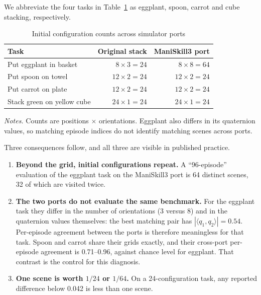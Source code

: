\documentclass[pdflatex,iicol,sn-apa]{sn-jnl}
\theoremstyle{remark}
\newcommand{\tablenote}[1]{\par\vspace{4pt}\noindent
\begin{minipage}{\linewidth}\tablefootnotefont\raggedright #1\par\end{minipage}}
\begin{document}
We abbreviate the four tasks in Table~\ref{tab2} as eggplant, spoon, carrot and cube stacking, respectively.

\begin{table}[t]
\centering
\begin{lrbox}{\tablecontentbox}
\begin{tabular}{@{}lrr@{}}
\toprule
Task & Original stack & ManiSkill3 port \\
\midrule
Put eggplant in basket & $8 \times 3 = 24$ & $8 \times 8 = 64$ \\
Put spoon on towel & $12 \times 2 = 24$ & $12 \times 2 = 24$ \\
Put carrot on plate & $12 \times 2 = 24$ & $12 \times 2 = 24$ \\
Stack green on yellow cube & $24 \times 1 = 24$ & $24 \times 1 = 24$ \\
\bottomrule
\end{tabular}
\end{lrbox}
\begin{minipage}{\wd\tablecontentbox}
\caption{Initial configuration counts across simulator ports}\label{tab2}
\usebox{\tablecontentbox}
\tablenote{\textit{Notes.} Counts are positions $\times$ orientations. Eggplant also differs in its quaternion values, so matching episode indices do not identify matching scenes across ports.}
\end{minipage}
\end{table}

Three consequences follow, and all three are visible in published practice.

\begin{enumerate}
\item \textbf{Beyond the grid, initial configurations repeat.} A ``96-episode'' evaluation of the
eggplant task on the ManiSkill3 port is 64 distinct scenes, 32 of which are visited twice.
\item \textbf{The two ports do not evaluate the same benchmark.} For the eggplant task they differ
in the number of orientations (3 versus 8) and in the quaternion values themselves: the best matching
pair has $|\langle q_1, q_2 \rangle| = 0.54$. Per-episode agreement between the ports is therefore
meaningless for that task. Spoon and carrot share their grids exactly, and their cross-port
per-episode agreement is 0.71--0.96, against chance level for eggplant. That contrast is the control
for this diagnosis.
\item \textbf{One scene is worth $1/24$ or $1/64$.} On a 24-configuration task, any reported
difference below 0.042 is less than one scene.
\end{enumerate}
\end{document}
